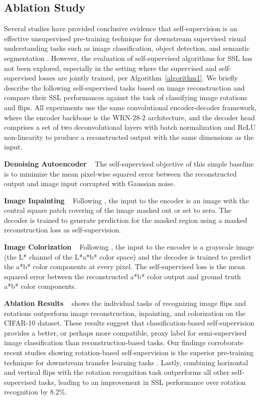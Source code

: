 \documentclass{article}
\begin{document}
\subsection{Ablation Study}
Several studies have provided conclusive evidence that self-supervision is an effective unsupervised pre-training technique for downstream supervised visual understanding tasks such as image classification, object detection, and semantic segmentation \cite{multiself,revisit-ssl}. However, the evaluation of self-supervised algorithms for SSL has not been explored, especially in the setting where the supervised and self-supervised losses are jointly trained, per Algorithm~\ref{algorithm1}. We briefly describe the following self-supervised tasks based on image reconstruction and compare their SSL performances against the task of classifying image rotations and flips. All experiments use the same convolutional encoder-decoder framework, where the encoder backbone is the WRN-28-2 architecture, and the decoder head comprises a set of two deconvolutional layers \cite{fcn} with batch normalization and ReLU non-linearity to produce a reconstructed output with the same dimensions as the input.

\textbf{Denoising Autoencoder} ~ The self-supervised objective of this simple baseline is to minimize the mean pixel-wise squared error between the reconstructed output and image input corrupted with Gaussian noise.

\textbf{Image Inpainting} ~ Following \cite{inpainting}, the input to the encoder is an image with the central square patch covering  of the image masked out or set to zero. The decoder is trained to generate prediction for the masked region using a masked  reconstruction loss as self-supervision.

\textbf{Image Colorization} ~ Following \cite{colorization}, the input to the encoder is a grayscale image (the L* channel of the L*a*b* color space) and the decoder is trained to predict the a*b* color components at every pixel. The self-supervised loss is the mean squared error between the reconstructed a*b* color output and ground truth a*b* color components.

\textbf{Ablation Results} ~  shows the individual tasks of recognizing image flips and rotations outperform image reconstruction, inpainting, and colorization on the CIFAR-10 dataset. These results suggest that classification-based self-supervision provides a better, or perhaps more compatible, proxy label for semi-supervised image classification than reconstruction-based tasks. Our findings corroborate recent studies showing rotation-based self-supervision is the superior pre-training technique for downstream transfer learning tasks \cite{rotations,revisit-ssl}. Lastly, combining horizontal and vertical flips with the rotation recognition task outperforms all other self-supervised tasks, leading to an improvement in SSL performance over rotation recognition by 8.2\%.
\end{document}
